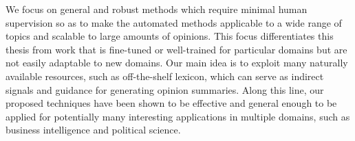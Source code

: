 \begin{eabstract}
We focus on general and robust methods which require minimal human supervision so as to make the automated methods applicable to a wide range of topics and scalable to large amounts of opinions. This focus differentiates this thesis from work that is fine-tuned or well-trained for particular domains but are not easily adaptable to new domains. Our main idea is to exploit many naturally available resources, such as off-the-shelf lexicon, which can serve as indirect signals and guidance for generating opinion summaries. Along this line, our proposed techniques have been shown to be effective and general enough to be applied for potentially many interesting applications in multiple domains, such as business intelligence and political science.
\end{eabstract}

